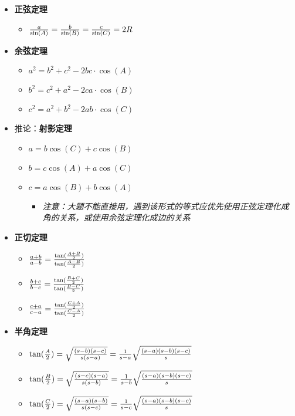 \documentclass[
]{article}
\begin{document}
\begin{itemize}
\item
  \textbf{正弦定理}

  \begin{itemize}
  \item
    \({a \over \sin(A)} = {b \over \sin(B)}={c \over \sin(C)} = 2R\)
  \end{itemize}
\item
  \textbf{余弦定理}

  \begin{itemize}
  \item
    \(a^2 = b^2 + c^2 - 2bc \cdot \cos(A)\)
  \item
    \(b^2 = c^2 + a^2 - 2ca \cdot \cos(B)\)
  \item
    \(c^2 = a^2 + b^2 - 2ab \cdot \cos(C)\)
  \end{itemize}
\item
  推论：\textbf{射影定理}

  \begin{itemize}
  \item
    \(a = b\cos(C) + c\cos(B)\)
  \item
    \(b = c\cos(A) + a\cos(C)\)
  \item
    \(c = a\cos(B) + b\cos(A)\)

    \begin{itemize}
    \item
      \emph{注意：大题不能直接用，遇到该形式的等式应优先使用正弦定理化成角的关系，或使用余弦定理化成边的关系}
    \end{itemize}
  \end{itemize}
\item
  \textbf{正切定理}

  \begin{itemize}
  \item
    \({{a + b} \over {a - b}} = {\tan({{A + B} \over 2}) \over \tan({{A - B} \over 2})}\)
  \item
    \({{b + c} \over {b - c}} = {\tan({{B + C} \over 2}) \over \tan({{B - C} \over 2})}\)
  \item
    \({{c + a} \over {c - a}} = {\tan({{C + A} \over 2}) \over \tan({{C - A} \over 2})}\)
  \end{itemize}
\item
  \textbf{半角定理}

  \begin{itemize}
  \item
    \(\tan({A \over 2}) = \sqrt{{(s - b)(s - c)} \over {s(s - a)}} = {1 \over {s - a}}\sqrt{{(s - a)(s - b)(s - c)}\over s}\)
  \item
    \(\tan({B \over 2}) = \sqrt{{(s - c)(s - a)} \over {s(s - b)}} = {1 \over {s - b}}\sqrt{{(s - a)(s - b)(s - c)}\over s}\)
  \item
    \(\tan({C \over 2}) = \sqrt{{(s - a)(s - b)} \over {s(s - c)}} = {1 \over {s - c}}\sqrt{{(s - a)(s - b)(s - c)}\over s}\)
  \end{itemize}
\end{itemize}
\end{document}
